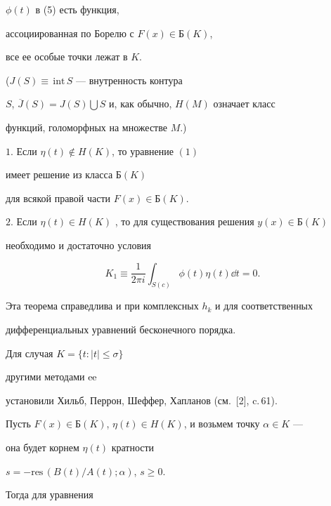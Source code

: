 $\phi(t)$ в (5) есть функция,


ассоциированная по Борелю с $F(x) \in Б(K)$,


все ее особые точки лежат в $K$.


($J(S) \equiv \,\text{int}\,S$ --- внутренность контура


$S$, $\overline J(S)=J(S)\bigcup S$ и, как обычно, $H(M)$ означает класс


функций, голоморфных на множестве $M$.)





\begin{thm}


$1.$ Если $\eta(t)\notin H(K)$, то уравнение $(1)$


имеет решение из класса $Б(K)$


для всякой правой части $F(x) \in Б(K)$.





$2.$ Если $\eta(t)\in H(K)$ , то для существования решения $y(x)\in Б(K)$


необходимо и достаточно условия


\begin{equation}


K_1\equiv\frac{1}{2 \pi i}\int_{S(c)}{\phi(t)\eta(t)\dd t}=0.


\end{equation}


\end{thm}





Эта теорема справедлива и при комплексных $h_k$ и для соответственных


дифференциальных уравнений бесконечного порядка.


Для случая $K=\{t:|t|\le\sigma\}$


другими методами ee


установили Хильб, Перрон, Шеффер, Хапланов (см.~[2], c.\,61).





Пусть $F(x) \in Б(K)$, $\eta(t) \in H(K)$, и возьмем точку $\alpha \in K$ ---


она будет корнем $\eta(t)$ кратности


$s=-\text{res}\,(B(t)/A(t);\alpha)$, $s \ge 0$.


Тогда для уравнения


